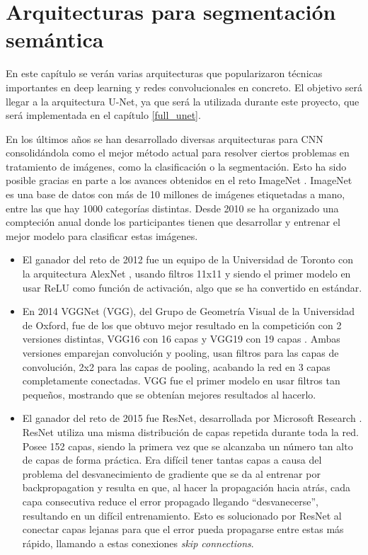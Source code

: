 \chapter{Arquitecturas para segmentación semántica}\label{sec:archs}

En este capítulo se verán varias arquitecturas que popularizaron técnicas importantes en deep learning y redes convolucionales en concreto. El objetivo será llegar a la arquitectura U-Net, ya que será la utilizada durante este proyecto, que será implementada en el capítulo \ref{full_unet}.

En los últimos años se han desarrollado diversas arquitecturas para CNN consolidándola como el mejor método actual para resolver ciertos problemas en tratamiento de imágenes, como la clasificación o la segmentación. Esto ha sido posible gracias en parte a los avances obtenidos en el reto ImageNet \cite{Deng2009}. 
ImageNet es una base de datos con más de 10 millones de imágenes etiquetadas a mano, entre las que hay 1000 categorías distintas. Desde 2010 se ha organizado una compteción anual donde los participantes tienen que desarrollar y entrenar el mejor modelo para clasificar estas imágenes. 
\begin{itemize}
\item El ganador del reto de 2012 fue un equipo de la Universidad de Toronto con la arquitectura AlexNet \cite{Krizhevsky2012}, usando filtros 11x11 y siendo el primer modelo en usar ReLU como función de activación, algo que se ha convertido en estándar.
\item En 2014 VGGNet (VGG), del Grupo de Geometría Visual de la Universidad de Oxford, fue de los que obtuvo mejor resultado en la competición con 2 versiones distintas, VGG16 con 16 capas y VGG19 con 19 capas \cite{Simonyan2014}. Ambas versiones emparejan convolución y pooling, usan filtros para las capas de convolución, 2x2 para las capas de pooling, acabando la red en 3 capas completamente conectadas. VGG fue el primer modelo en usar filtros tan pequeños, mostrando que se obtenían mejores resultados al hacerlo.
\item El ganador del reto de 2015 fue ResNet, desarrollada por Microsoft Research \cite{He2015}. ResNet utiliza una misma distribución de capas repetida durante toda la red. Posee 152 capas, siendo la primera vez que se alcanzaba un número tan alto de capas de forma práctica. Era difícil tener tantas capas a causa del problema del desvanecimiento de gradiente \cite{Hochreiter1998} que se da al entrenar por backpropagation y resulta en que, al hacer la propagación hacia atrás, cada capa consecutiva reduce el error propagado llegando ``desvanecerse'', resultando en un difícil entrenamiento. Esto es solucionado por ResNet al conectar capas lejanas para que el error pueda propagarse entre estas más rápido, llamando a estas conexiones \textit{skip connections}.
\end{itemize}

